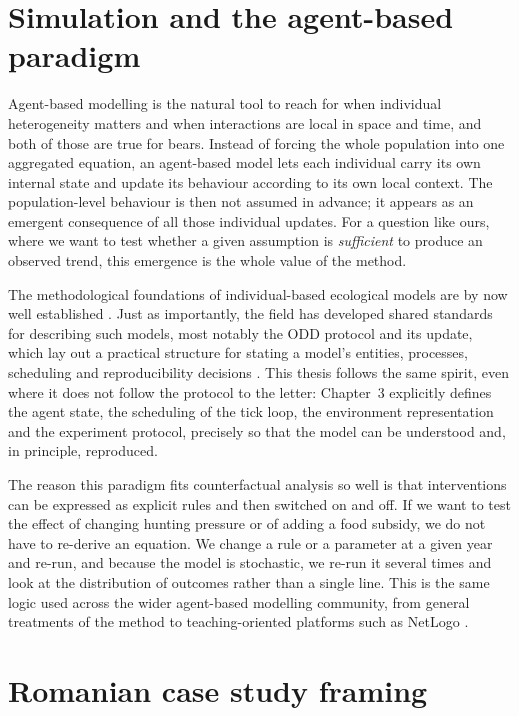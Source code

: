 \section{Simulation and the agent-based paradigm}

Agent-based modelling is the natural tool to reach for when individual heterogeneity matters and when interactions are local in space and time, and both of those are true for bears. Instead of forcing the whole population into one aggregated equation, an agent-based model lets each individual carry its own internal state and update its behaviour according to its own local context. The population-level behaviour is then not assumed in advance; it appears as an emergent consequence of all those individual updates. For a question like ours, where we want to test whether a given assumption is \emph{sufficient} to produce an observed trend, this emergence is the whole value of the method.

The methodological foundations of individual-based ecological models are by now well established \cite{GrimmRailsback2005,RailsbackGrimm2019,DeAngelis2005}. Just as importantly, the field has developed shared standards for describing such models, most notably the ODD protocol and its update, which lay out a practical structure for stating a model's entities, processes, scheduling and reproducibility decisions \cite{Grimm2006ODD,Grimm2020ODD}. This thesis follows the same spirit, even where it does not follow the protocol to the letter: Chapter~3 explicitly defines the agent state, the scheduling of the tick loop, the environment representation and the experiment protocol, precisely so that the model can be understood and, in principle, reproduced.

The reason this paradigm fits counterfactual analysis so well is that interventions can be expressed as explicit rules and then switched on and off. If we want to test the effect of changing hunting pressure or of adding a food subsidy, we do not have to re-derive an equation. We change a rule or a parameter at a given year and re-run, and because the model is stochastic, we re-run it several times and look at the distribution of outcomes rather than a single line. This is the same logic used across the wider agent-based modelling community, from general treatments of the method \cite{Macal2016} to teaching-oriented platforms such as NetLogo \cite{WilenskyRand2015}.

\section{Romanian case study framing}

